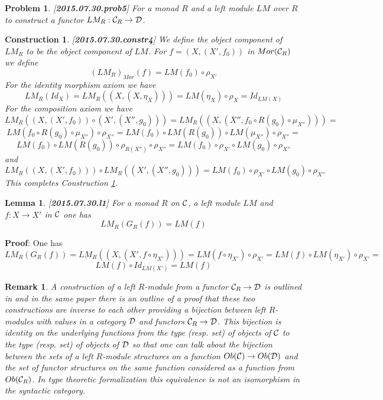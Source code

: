 \documentclass[11pt]{article}
\newenvironment{proof}{{\bf Proof}:}{\vskip 5mm }
\newtheorem{lemma}[proposition]{Lemma}
\newtheorem{remark}[proposition]{Remark}
\newtheorem{problem}[proposition]{Problem}
\newtheorem{construction}[proposition]{Construction}
\newcommand{\llabel}[1]{\label{#1}[{\bf #1}]}
\newcommand{\sr}{\rightarrow}
\begin{document}
{%
\begin{problem}
\llabel{2015.07.30.prob5}
For a monad $R$ and a left module $LM$ over $R$ to construct a functor $LM_R:{\cal C}_R\sr {\cal D}$.
\end{problem}
%
\begin{construction}\rm
\llabel{2015.07.30.constr4}
We define the object component of $LM_R$ to be the object component of $LM$. For $f=(X,(X',f_0))$ in $Mor({\cal C}_R)$ we define 
%
$$(LM_R)_{Mor}(f)=LM(f_0)\circ \rho_{X'}$$
%
For the identity morphism axiom we have
%
$$LM_R(Id_X)=LM_R((X,(X,\eta_X)))=LM(\eta_X)\circ \rho_X=Id_{LM(X)}$$
%
For the composition axiom we have
%
$$LM_R((X,(X',f_0))\circ (X',(X'',g_0)))=LM_R((X,(X'',f_0\circ R(g_0)\circ \mu_{X''})))=$$$$LM(f_0\circ R(g_0)\circ \mu_{X''})\circ \rho_{X''}=LM(f_0)\circ LM(R(g_0))\circ LM(\mu_{X''})\circ \rho_{X''}=$$$$LM(f_0)\circ LM(R(g_0))\circ \rho_{R(X'')}\circ \rho_{X''}=LM(f_0)\circ \rho_{X'}\circ LM(g_0)\circ \rho_{X''}$$
%
and
%
$$LM_R((X,(X',f_0)))\circ LM_R((X',(X'',g_0)))=LM(f_0)\circ \rho_{X'}\circ LM(g_0)\circ \rho_{X''}$$
%
This completes Construction \ref{2015.07.30.constr4}.
\end{construction}
%
\begin{lemma}
\llabel{2015.07.30.l1}
For a monad $R$ on $\cal C$, a left module $LM$ and $f:X\sr X'$ in $\cal C$ one has
%
$$LM_R(G_R(f))=LM(f)$$
%
\end{lemma}
%
\begin{proof}
One has
%
$$LM_R(G_R(f))=LM_R((X,(X',f\circ \eta_{X'})))=LM(f\circ \eta_{X'})\circ \rho_{X'}=LM(f)\circ LM(\eta_{X'})\circ \rho_{X'}=$$$$LM(f)\circ Id_{LM(X')}=LM(f)$$
%
\end{proof}
%
%
\begin{remark}\rm
A construction of a left $R$-module from a functor ${\cal C}_R\sr {\cal D}$ is outlined in \cite[Prop. 3]{HM2010} and in the same paper there is an outline of a proof that these two constructions are inverse to each other providing a bijection between left $R$-modules with values in a category $\cal D$ and functors ${\cal C}_R\sr {\cal D}$. This bijection is identity on the underlying functions from the type (resp. set) of objects of ${\cal C}$ to the type (resp. set) of objects of $\cal D$ so that one can talk about the bijection between the sets of a left $R$-module structures on a function $Ob({\cal C})\sr Ob({\cal D})$ and the set of functor structures on the same function considered as a function from $Ob({\cal C}_R)$. In type theoretic formalization this equivalence is not an isomorphism in the syntactic category.
\end{remark}
%


}
\end{document}
